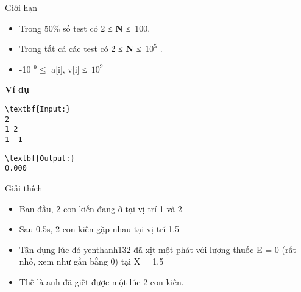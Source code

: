Giới hạn
\begin{itemize}
	\item Trong 50\% số test có 2 ≤ \textbf{ N } ≤ 100.
	\item Trong tất cả các test có 2 ≤ \textbf{ N } ≤ $10^{5}$ .
	\item -10 $^ 9 ≤ $ a[i], v[i] ≤ $10^{9}$
\end{itemize}
\begin{itemize}
\end{itemize}
\textbf{Ví dụ }
\begin{verbatim}
\textbf{Input:}
2
1 2
1 -1
\end{verbatim}
\begin{verbatim}
\textbf{Output:}
0.000\end{verbatim}
Giải thích
\begin{itemize}
	\item Ban đầu, 2 con kiến đang ở tại vị trí 1 và 2
	\item Sau 0.5s, 2 con kiến gặp nhau tại vị trí 1.5
	\item Tận dụng lúc đó yenthanh132 đã xịt một phát với lượng thuốc E = 0 (rất nhỏ, xem như gần bằng 0) tại X = 1.5
	\item Thế là anh đã giết được một lúc 2 con kiến.
\end{itemize}